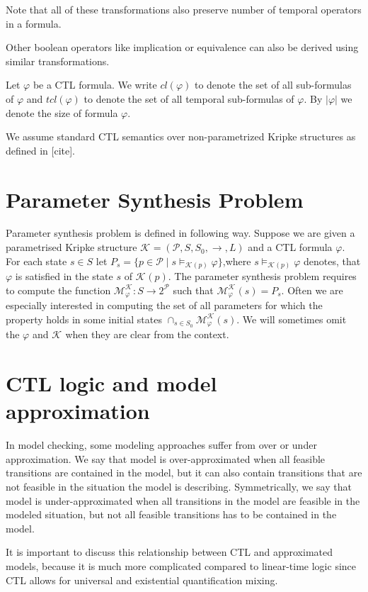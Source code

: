 \documentclass[12pt,oneside,draft]{fithesis2}
\newcommand{\ks}[1][]{\ensuremath{\mathcal{K}_{#1}}}
\newcommand{\fullKs}{\ensuremath{ \ks = (\params, S, S_0, \trans{}, L) }}
\newcommand{\trans}[1]{\stackrel{#1}{\rightarrow}}
\newcommand{\params}{\mathcal{P}}
\begin{document}
			Note that all of these transformations also preserve number of temporal operators in a formula. 
			
			Other boolean operators like implication or equivalence can also be derived using similar transformations. 			
			
			Let $\varphi$ be a CTL formula. We write $cl(\varphi)$ to denote the set of all sub-formulas of $\varphi$ and $tcl(\varphi)$ to denote the set of all temporal sub-formulas of $\varphi$. By $|\varphi|$ we denote the size of formula $\varphi$.
			
			We assume standard CTL semantics over non-parametrized Kripke structures as defined in [cite].

		\section{Parameter Synthesis Problem}
			
			Parameter synthesis problem is defined in following way. Suppose we are given a parametrised Kripke structure $\fullKs$ and a CTL formula $\varphi$. For each state $s \in S$ let $ P_s = \{ p \in \params \mid s \models_{\ks(p)} \varphi \} $,where $s \models_{\ks(p)} \varphi$ denotes, that $\varphi$ is satisfied in the state $s$ of $\ks(p)$. The parameter synthesis problem requires to compute the function $\mathcal{M}_{\varphi}^{\ks} : S \rightarrow 2^\params $ such that $\mathcal{M}_{\varphi}^{\ks}(s) = P_s$. Often we are especially interested in computing the set of all parameters for which the property holds in some initial states $\cap_{s\in S_0}\mathcal{M}_\varphi^{\mathcal K}(s)$. We will sometimes omit the $\varphi$ and $\ks$ when they are clear from the context.	
				
		\section{CTL logic and model approximation}
		
			In model checking, some modeling approaches suffer from over or under approximation. We say that model is over-approximated when all feasible transitions are contained in the model, but it can also contain transitions that are not feasible in the situation the model is describing. Symmetrically, we say that model is under-approximated when all transitions in the model are feasible in the modeled situation, but not all feasible transitions has to be contained in the model. 
			
			It is important to discuss this relationship between CTL and approximated models, because it is much more complicated compared to linear-time logic since CTL allows for universal and existential quantification mixing.
			
\end{document}
